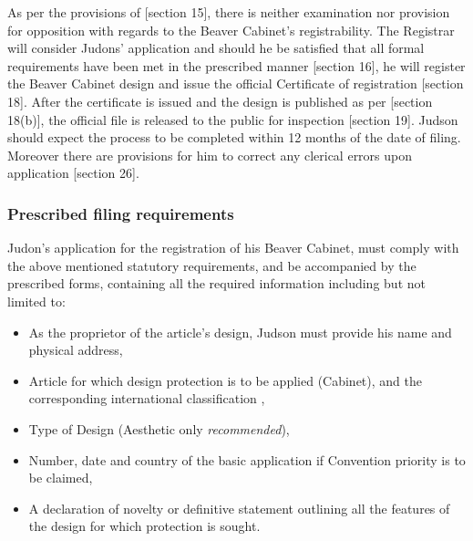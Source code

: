 \documentclass[11pt]{article}
\begin{document}
As per the provisions of [section 15]\cite{rsa93_designs_act}, there is neither
examination nor provision for opposition with regards to the Beaver Cabinet's
registrability. The Registrar will consider Judons' application and should he be
satisfied that all formal requirements have been met in the prescribed manner
[section 16]\cite{rsa93_designs_act}, he will register the Beaver Cabinet design
and issue the official Certificate of registration [section
18]\cite{rsa93_designs_act}. After the certificate is issued and the design is
published as per [section 18(b)]\cite{rsa93_designs_act}, the official file is
released to the public for inspection [section 19]\cite{rsa93_designs_act}. Judson
should expect the process to be completed within 12 months of the date of
filing. Moreover there are provisions for him to correct any clerical errors
upon application [section 26]\cite{rsa93_designs_act}.

\subsubsection{Prescribed filing requirements}
\label{sec:orgdecb084}
Judon's application for the registration of his Beaver Cabinet, must comply with
the above mentioned statutory requirements, and be accompanied by the prescribed
forms, containing all the required information including but not limited to:

\begin{itemize}
\item As the proprietor of the article's design, Judson must provide his name and
physical address,
\item Article for which design protection is to be applied (Cabinet), and the
corresponding international classification \cite{wipo79_locarno_agreement},
\item Type of Design (Aesthetic only \emph{recommended}),
\item Number, date and country of the basic application if Convention priority is to
be claimed,
\item A declaration of novelty or definitive statement outlining all the features
of the design for which protection is sought.
\end{itemize}


\printbibliography
\end{document}

